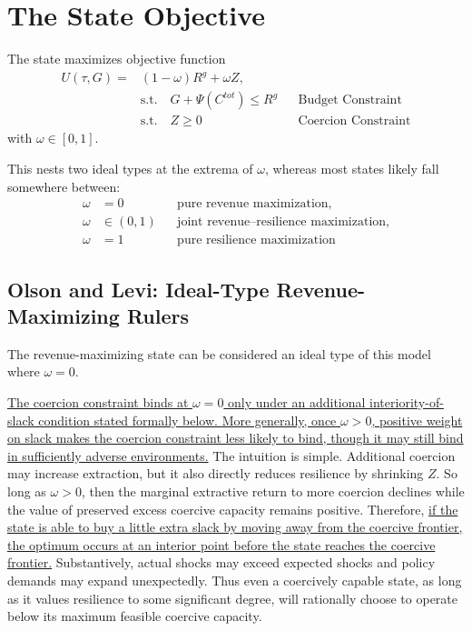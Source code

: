 \documentclass[12pt]{article}
\begin{document}
\section{The State Objective}

The state maximizes objective function
\begin{align}
U(\tau,G) =& (1-\omega)R^g + \omega Z, \\
& \text{s.t.} \quad G + \Psi(C^{tot}) \le R^g && \text{Budget Constraint} \\
& \text{s.t.} \quad Z \ge 0 && \text{Coercion Constraint}
\label{eq:jointobj}
\end{align}
with $\omega \in [0,1]$.

This nests two ideal types at the extrema of $\omega$, whereas most states likely fall somewhere between:
\begin{align*}
\omega &= 0 && \text{pure revenue maximization},\\
\omega &\in (0,1) && \text{joint revenue--resilience maximization}, \\
\omega &= 1 && \text{pure resilience maximization}
\end{align*}

\subsection{Olson and Levi: Ideal-Type Revenue-Maximizing Rulers}

The revenue-maximizing state can be considered an ideal type of this model where $\omega = 0$.

\underline{The coercion constraint binds at $\omega=0$ only under an additional interiority-of-slack condition stated formally below. More generally, once $\omega>0$, positive weight on slack makes the coercion constraint less likely to bind, though it may still bind in sufficiently adverse environments.} The intuition is simple. Additional coercion may increase extraction, but it also directly reduces resilience by shrinking $Z$. So long as $\omega > 0$, then the marginal extractive return to more coercion declines while the value of preserved excess coercive capacity remains positive. Therefore, \underline{if the state is able to buy a little extra slack by moving away from the coercive frontier, the optimum occurs at an interior point before the state reaches the coercive frontier.} Substantively, actual shocks may exceed expected shocks and policy demands may expand unexpectedly. Thus even a coercively capable state, as long as it values resilience to some significant degree, will rationally choose to operate below its maximum feasible coercive capacity.
\end{document}
